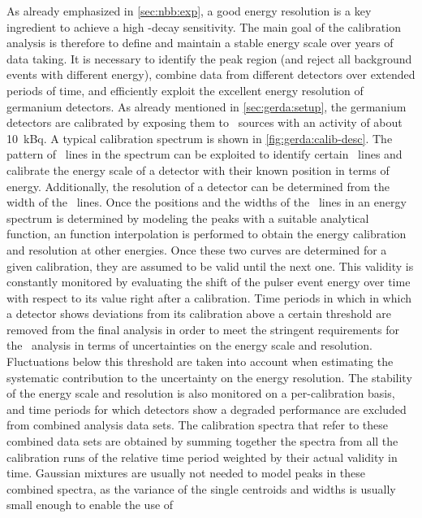As already emphasized in \cref{sec:nbb:exp}, a good energy resolution is a key ingredient
to achieve a high \onbb-decay sensitivity. The main goal of the calibration analysis is
therefore to define and maintain a stable energy scale over years of data taking.  It
is necessary to identify the peak region (and reject all background events with
different energy), combine data from different detectors over extended periods of time,
and efficiently exploit the excellent energy resolution of germanium detectors.
\newpar
As already mentioned in \cref{sec:gerda:setup}, the germanium detectors are calibrated by
exposing them to \Th\ sources with an activity of about 10~kBq. A typical calibration
spectrum is shown in \cref{fig:gerda:calib-desc}. The pattern of \g\ lines in the spectrum
can be exploited to identify certain \g\ lines and calibrate the energy scale of a
detector with their known position in terms of energy. Additionally, the resolution of a
detector can be determined from the width of the \g\ lines. Once the positions and the
widths of the \g\ lines in an energy spectrum is determined by modeling the peaks with a
suitable analytical function, an function interpolation is performed to obtain the energy
calibration and resolution at other energies. Once these two curves are determined for a
given calibration, they are assumed to be valid until the next one. This validity is
constantly monitored by evaluating the shift of the pulser event energy over time with
respect to its value right after a calibration. Time periods in which in which a detector
shows deviations from its calibration above a certain threshold are removed from the final
analysis in order to meet the stringent requirements for the \onbb\ analysis in terms of
uncertainties on the energy scale and resolution. Fluctuations below this threshold are
taken into account when estimating the systematic contribution to the uncertainty on the
energy resolution. The stability of the energy scale and resolution is also monitored on a
per-calibration basis, and time periods for which detectors show a degraded performance
are excluded from combined analysis data sets.  The calibration spectra that refer to
these combined data sets are obtained by summing together the spectra from all the
calibration runs of the relative time period weighted by their actual validity in time.
Gaussian mixtures are usually not needed to model peaks in these combined spectra, as the
variance of the single centroids and widths is usually small enough to enable the use of
